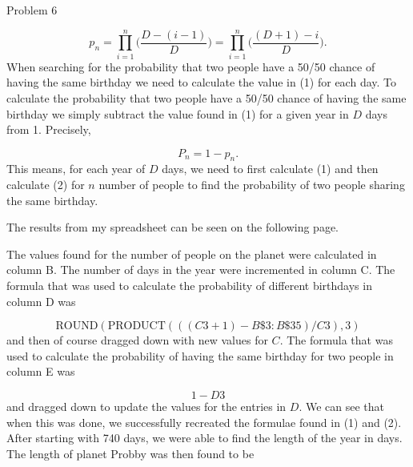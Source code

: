 \begin{problem}{Problem 6}
\begin{highlight}[Solution]
        \setcounter{equation}{0}
        \begin{equation}
            p_{n} = \prod_{i = 1}^{n} \Biggl(\frac{D - (i - 1)}{D}\Biggr) = \prod_{i = 1}^{n} \Biggl(\frac{(D + 1) - i}{D}\Biggr).
        \end{equation}
        When searching for the probability that two people have a 50/50 chance of having the same birthday we need to calculate the value in (1) for each day. To calculate the probability that two
        people have a 50/50 chance of having the same birthday we simply subtract the value found in (1) for a given year in $D$ days from 1. Precisely,

        \begin{equation}
            P_{n} = 1 - p_{n}.
        \end{equation}
        This means, for each year of $D$ days, we need to first calculate (1) and then calculate (2) for $n$ number of people to find the probability of two people sharing the same birthday.

        The results from my spreadsheet can be seen on the following page.
    \end{highlight}
    \clearpage  \clearpage
    \begin{highlight}
        The values found for the number of people on the planet were calculated in column B. The number of days in the year were incremented in column C. The formula that was used to calculate the
        probability of different birthdays in column D was

        \begin{equation}
            \text{ROUND}(\text{PRODUCT}(((C3+1)-B\$3:B\$35)/C3),3)
        \end{equation}
        and then of course dragged down with new values for $C$. The formula that was used to calculate the probability of having the same birthday for two people in column E was

        \begin{equation}
            1-D3
        \end{equation}
        and dragged down to update the values for the entries in $D$. We can see that when this was done, we successfully recreated the formulae found in (1) and (2). After starting with 740 days,
        we were able to find the length of the year in days. The length of planet Probby was then found to be


\end{highlight}
\end{problem}

